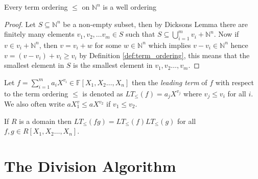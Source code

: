 \begin{corollary}\label{cor:every_term_ordering_is_a_well_ordering}
 Every term ordering $\leq$ on $\mathbb{N}^n$ is a well ordering
\end{corollary}
\begin{proof}
  Let $S \subseteq \mathbb{N}^{n}$ be a non-empty subset, then by Dicksons Lemma there are finitely many elements $v_1, v_2, \ldots v_m \in S$ such that $S \subseteq \bigcup_{i = 1}^{m} v_i + \mathbb{N}^{n}$.
  Now if $v \in v_i + \mathbb{N}^{n}$, then $v = v_i + w$ for some $w \in \mathbb{N}^{n}$ which implies $v - v_i \in \mathbb{N}^{n}$ hence $v = (v - v_i) + v_{i} \geq v_{i}$ by Definition \ref{def:term_ordering}, this means that the smallest element in $S$ is the smallest element in $v_1, v_2 \ldots, v_{m}$.
\end{proof}

\begin{definition}
  Let $f = \sum^{m}_{i = 1} a_i X^{v_{i}} \in \mathbb{F}[X_1, X_2 \ldots, X_{n}]$ then the \textit{leading term} of $f$ with respect to the term ordering $\leq$ is denoted as $LT_{\leq}(f) = a_{j}X^{v_{j}}$ where $v_j \leq v_{i}$ for all $i$. We also often write $aX^v_{1} \leq aX^{v_{2}}$ if $v_1 \leq v_{2}$.
\end{definition}
If $R$ is a domain then $LT_{\leq}(fg) = LT_{\leq}(f)LT_{\leq}(g)$ for all $f, g \in R[X_1, X_2 \ldots, X_{n}]$.

\section{The Division Algorithm}%
\label{sec:division algorithm for multivariate polynomials.}

